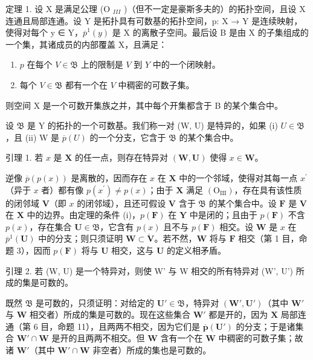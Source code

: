 定理 1. 设 X 是满足公理 (O \(_{III}\) )（但不一定是豪斯多夫的）的拓扑空间，且设 X 连通且局部连通。设 Y 是拓扑具有可数基的拓扑空间，p: X → Y 是连续映射，使得对每个 y ∈ Y，\(\overline{p}^{1}(y)\) 是 X 的离散子空间。最后设 B 是由 X 的子集组成的一个集，其诸成员的内部覆盖 X，且满足：

\begin{enumerate}
\def\labelenumi{(\roman{enumi})}
\tightlist
\item
  \(p\) 在每个 \(V \in \mathfrak{B}\) 上的限制是 \(V\) 到 \(Y\) 中的一个闭映射。\\
\item
  每个 \(V \in \mathfrak{B}\) 都有一个在 \(V\) 中稠密的可数子集。
\end{enumerate}

则空间 X 是一个可数开集族之并，其中每个开集都含于 B 的某个集合中。

设 \(\mathfrak{B}\) 是 Y 的拓扑的一个可数基。我们称一对 (W, U) 是特异的，如果 (i) \(U \in \mathfrak{B}\)，且 (ii) W 是 \(\overline{p}(U)\) 的一个分支，它含于 \(\mathfrak{B}\) 的某个集合中。

引理 1. 若 \(x\) 是 \(\mathbf{X}\) 的任一点，则存在特异对 \((\mathbf{W}, \mathbf{U})\) 使得 \(x \in \mathbf{W}\)。

逆像 \(\overline{p} (p(x))\) 是离散的，因而存在 \(x\) 在 \(\mathbf{X}\) 中的一个邻域，使得对其每一点 \(x^{\prime}\)（异于 \(x\) 者）都有像 \(p(x^{\prime})\neq p(x)\)；由于 \(\mathbf{X}\) 满足 \((\mathrm{O}_{\mathrm{III}})\)，存在具有该性质的闭邻域 \(\mathbf{V}\)（即 \(x\) 的闭邻域），且还可假设 \(\mathbf{V}\) 含于 \(\mathfrak{B}\) 的某个集合中。设 \(\mathbf{F}\) 是 \(\mathbf{V}\) 在 \(\mathbf{X}\) 中的边界。由定理的条件 (i)，\(p(\mathbf{F})\) 在 \(\mathbf{Y}\) 中是闭的；且由于 \(p(\mathbf{F})\) 不含 \(p(x)\)，存在集合 \(\mathbf{U}\in \mathfrak{B}\)，它含有 \(p(x)\) 且不与 \(p(\mathbf{F})\) 相交。设 \(\mathbf{W}\) 是 \(x\) 在 \(\overline{p}^{1}(\mathbf{U})\) 中的分支；则只须证明 \(\mathbf{W}\subset \mathring{\mathbf{V}}\)。若不然，\(\mathbf{W}\) 将与 \(\mathbf{F}\) 相交（第 1 目，命题 3），因而 \(p(\mathbf{F})\) 将与 \(\mathbf{U}\) 相交，这与 \(\mathbf{U}\) 的定义相矛盾。

引理 2. 若 (W, U) 是一个特异对，则使 W' 与 W 相交的所有特异对 (W', U') 所成的集是可数的。

既然 \(\mathfrak{B}\) 是可数的，只须证明：对给定的 \(\mathbf{U}' \in \mathfrak{B}\)，特异对 \((\mathbf{W}', \mathbf{U}')\)（其中 \(\mathbf{W}'\) 与 \(\mathbf{W}\) 相交者）所成的集是可数的。现在这些集合 \(\mathbf{W}'\) 都是开的，因为 \(\mathbf{X}\) 局部连通（第 6 目，命题 11），且两两不相交，因为它们是 \(\overline{\boldsymbol{p}}(\mathbf{U}')\) 的分支；于是诸集合 \(\mathbf{W}' \cap \mathbf{W}\) 是开的且两两不相交。但 \(\mathbf{W}\) 含有一个在 \(\mathbf{W}\) 中稠密的可数子集；故诸 \(\mathbf{W}'\)（其中 \(\mathbf{W}' \cap \mathbf{W}\) 非空者）所成的集也是可数的。

